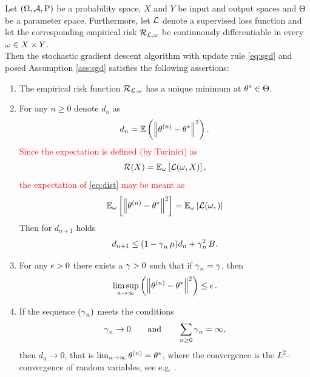\begin{theorem}\label{theorem:sgd}
Let $(\Omega, \operatorname{\mathcal{A}}, \operatorname{\text{P}})$ be a probability space, $X$ and $Y$ be input and output spaces and $\operatorname{\Theta}$ be a parameter space. Furthermore, let $\operatorname{\mathcal{L}}$ denote a supervised loss function and let the corresponding empirical risk $\operatorname{\mathcal{R}}_{\operatorname{\mathcal{L}}, \omega}$ be continuously differentiable in every $\omega\in X\times Y$.\\
Then the stochastic gradient descent algorithm with update rule \eqref{eq:sgd} and posed Assumption \ref{ass:sgd} satisfies the following assertions:
\begin{enumerate}
\item \label{ass1} The empirical risk function $\operatorname{\mathcal{R}}_{\operatorname{\mathcal{L}}, \omega}$ has a unique minimum at $\theta^{\ast}\in\operatorname{\Theta}$.
\item \label{ass2}For any $n\geq 0$ denote $d_n$ as
\begin{align}\label{eq:dist}
d_n = \operatorname{\mathbb{E}} \left( \left\| \theta^{(n)} - \theta^{\ast} \right\|^2 \right).
\end{align}
\textcolor{red}{Since the expectation is defined (by Turinici) as
\begin{align*}
\operatorname{\mathcal{R}}(X) = \operatorname{\mathbb{E}}_{\omega} \left[ \operatorname{\mathcal{L}}(\omega, X) \right],
\end{align*}
the expectation of \eqref{eq:dist} may be meant as
\begin{align*}
\operatorname{\mathbb{E}}_{\omega} \left[ \left\| \theta^{(n)} - \theta^{\ast} \right\|^2 \right] = \operatorname{\mathbb{E}}_{\omega} \left[ \operatorname{\mathcal{L}}(\omega, ) \right]
\end{align*}
}
Then for $d_{n+1}$ holds
\begin{align}\label{eq:dist_rec}
d_{n+1} \leq (1 - \operatorname{\gamma}_n\operatorname{\mu})d_n + \operatorname{\gamma}_n^2B.
\end{align}
\item \label{ass3}For any $\operatorname{\epsilon}>0$ there exists a $\operatorname{\gamma}>0$ such that if $\operatorname{\gamma}_n=\operatorname{\gamma}$, then
\begin{align}\label{eq:limsup}
\limsup_{n\to \infty} \left( \left\| \theta^{(n)} - \theta^{\ast} \right\|^2 \right) \leq \operatorname{\epsilon}.
\end{align}
\item \label{ass4} If the sequence $(\operatorname{\gamma}_n)$ meets the conditions
\begin{align}\label{eq:step_size}
\operatorname{\gamma}_n\to 0 \qquad \text{and} \qquad \sum_{n\geq 0} \operatorname{\gamma}_n = \infty,
\end{align}
then $d_n\to 0$, that is $\lim_{n\to\infty}\theta^{(n)} = \theta^{\ast}$, where the convergence is the $L^2$-convergence of random variables, see e.g. \cite[Chapter~7]{klenke2013probability}.
\end{enumerate}
\end{theorem}

